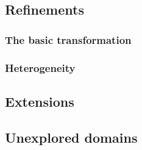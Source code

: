 
\subsection{Refinements}

\subsubsection{The basic transformation}
\subsubsection{Heterogeneity}


\subsection{Extensions}

\subsection{Unexplored domains}

